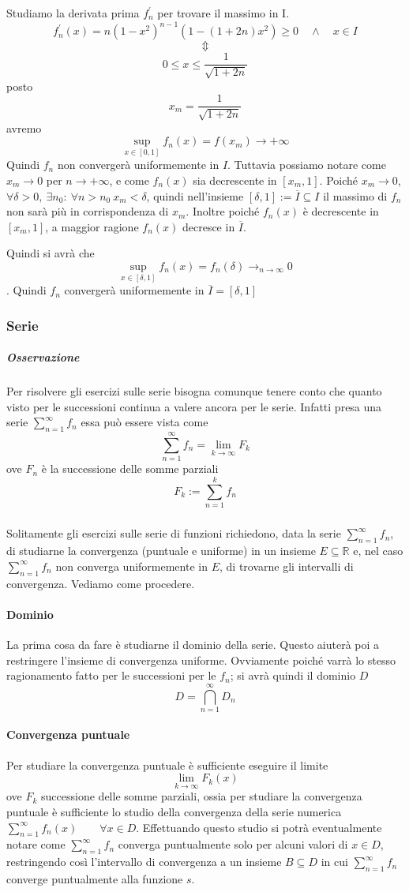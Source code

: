 \documentclass[a4paper,12pt]{article}
\begin{document}
Studiamo la derivata prima $f^{'}_n$ per trovare il massimo in I.
\begin{displaymath}
f^{'}_n(x)=n(1-x^2)^{n-1}(1-(1+2n)x^2)\geq 0 \quad \wedge \quad x\in I
\end{displaymath}
$$ \Updownarrow$$
$$0\leq x\leq \frac{1}{\sqrt{1+2n}}$$
posto $$x_m=\frac{1}{\sqrt{1+2n}}$$ avremo
$$\sup_{x\in[0,1]}f_n(x)=f(x_m)\to + \infty$$
Quindi $f_n$ non convergerà uniformemente in $I$.
Tuttavia possiamo notare come $x_m\to 0$ per $n\to + \infty$, e come $f_n(x)$ sia decrescente in $[x_m,1]$.
Poiché $x_m\to 0$, $\forall \delta>0, \ \exists n_0: \ \forall n>n_0 \ x_m<\delta$, quindi nell'insieme $[\delta,1]:=\overline{I}\subseteq I$ il massimo di $f_n$ non sarà più in corrispondenza di $x_m$. Inoltre poiché $f_n(x)$ è decrescente in $[x_m,1]$, a maggior ragione $f_n(x)$ decresce in $\overline{I}$.

Quindi si avrà che 
$$\sup_{x\in[\delta,1]}f_n(x)=f_n(\delta)\rightarrow_{n\to\infty} 0  $$.
Quindi $f_n$ convergerà uniformemente in $\overline{I}=[\delta,1]$
 
\subsubsection{Serie}
\subparagraph*{Osservazione}
Per risolvere gli esercizi sulle serie bisogna comunque tenere conto che quanto visto per le successioni continua a valere ancora per le serie. Infatti presa una serie $\sum_{n=1}^{\infty}f_n$ essa può essere vista come 
$$\sum_{n=1}^{\infty}f_n=\lim_{k\to\infty}F_k$$
ove $F_n$ è la successione delle somme parziali
$$F_k:=\sum_{n=1}^{k}f_n$$
\subparagraph*{}
Solitamente gli esercizi sulle serie di funzioni richiedono, data la serie $\sum_{n=1}^{\infty}f_n$, di studiarne la convergenza (puntuale e uniforme) in un insieme $E\subseteq \mathbb{R}$ e, nel caso $\sum_{n=1}^{\infty}f_n$ non converga uniformemente in $E$, di trovarne gli intervalli di convergenza. Vediamo come procedere.
\paragraph*{Dominio}
La prima cosa da fare è studiarne il dominio della serie. Questo aiuterà poi a restringere l'insieme di convergenza uniforme. Ovviamente poiché varrà lo stesso ragionamento fatto per le successioni per le $f_n$; si avrà quindi il dominio $D$
$$D=\displaystyle\bigcap_{n=1}^{\infty} D_n$$
\paragraph*{Convergenza puntuale}
Per studiare la convergenza puntuale è sufficiente eseguire il limite
$$\lim_{k\to\infty} F_k(x)$$
ove $F_k$ successione delle somme parziali, ossia per studiare la convergenza puntuale è sufficiente lo studio della convergenza della serie numerica $\sum_{n=1}^{\infty}f_n(x) \qquad \forall x \in D$.
Effettuando questo studio si potrà eventualmente notare come $\sum_{n=1}^{\infty}f_n$ converga puntualmente solo per alcuni valori di $x\in D$, restringendo così l'intervallo di convergenza a un insieme $B\subseteq D$ in cui $\sum_{n=1}^{\infty}f_n$ converge puntualmente alla funzione $s$.
\end{document}
